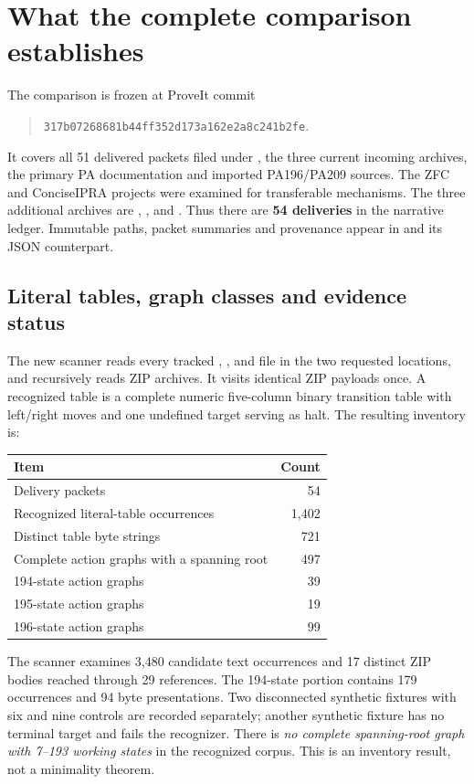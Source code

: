 \section{What the complete comparison establishes}
\label{sec:comparison}

The comparison is frozen at ProveIt commit
\begin{quote}\small\nolinkurl{317b07268681b44ff352d173a162e2a8c241b2fe}.\end{quote}
It covers all 51 delivered packets filed under
, the three current incoming
archives, the primary PA documentation and imported PA196/PA209 sources.
The ZFC and ConciseIPRA projects were examined for transferable mechanisms.
The three additional archives are ,
, and
. Thus there are \textbf{54 deliveries}
in the narrative ledger. Immutable paths, packet summaries and provenance
appear in  and its JSON counterpart.

\subsection{Literal tables, graph classes and evidence status}

The new scanner reads every tracked , , 
and  file in the two requested locations, and recursively reads
ZIP archives. It visits identical ZIP payloads once. A recognized table is
a complete numeric five-column binary transition table with left/right
moves and one undefined target serving as halt. The resulting inventory is:
\begin{center}
\begin{tabular}{@{}lr@{}}\toprule
Item & Count\\\midrule
Delivery packets & 54\\
Recognized literal-table occurrences & 1,402\\
Distinct table byte strings & 721\\
Complete action graphs with a spanning root & 497\\
194-state action graphs & 39\\
195-state action graphs & 19\\
196-state action graphs & 99\\
\bottomrule\end{tabular}
\end{center}
The scanner examines 3,480 candidate text occurrences and 17 distinct ZIP
bodies reached through 29 references. The 194-state portion contains 179
occurrences and 94 byte presentations. Two disconnected synthetic fixtures
with six and nine controls are recorded separately; another synthetic
fixture has no terminal target and fails the recognizer. There is
\emph{no complete spanning-root graph with 7--193 working states} in the
recognized corpus. This is an inventory result, not a minimality theorem.

